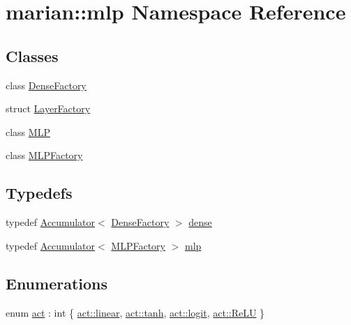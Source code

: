 \hypertarget{namespacemarian_1_1mlp}{}\section{marian\+:\+:mlp Namespace Reference}
\label{namespacemarian_1_1mlp}
\subsection*{Classes}
\begin{DoxyCompactItemize}
\item 
class \hyperlink{classmarian_1_1mlp_1_1DenseFactory}{Dense\+Factory}
\item 
struct \hyperlink{structmarian_1_1mlp_1_1LayerFactory}{Layer\+Factory}
\item 
class \hyperlink{classmarian_1_1mlp_1_1MLP}{M\+LP}
\item 
class \hyperlink{classmarian_1_1mlp_1_1MLPFactory}{M\+L\+P\+Factory}
\end{DoxyCompactItemize}
\subsection*{Typedefs}
\begin{DoxyCompactItemize}
\item 
typedef \hyperlink{classmarian_1_1Accumulator}{Accumulator}$<$ \hyperlink{classmarian_1_1mlp_1_1DenseFactory}{Dense\+Factory} $>$ \hyperlink{namespacemarian_1_1mlp_a8c25b1e343bf78e66cd9e33e607efeb5}{dense}
\item 
typedef \hyperlink{classmarian_1_1Accumulator}{Accumulator}$<$ \hyperlink{classmarian_1_1mlp_1_1MLPFactory}{M\+L\+P\+Factory} $>$ \hyperlink{namespacemarian_1_1mlp_a4d0fe240d31bdc33bcbdb5401de49e27}{mlp}
\end{DoxyCompactItemize}
\subsection*{Enumerations}
\begin{DoxyCompactItemize}
\item 
enum \hyperlink{namespacemarian_1_1mlp_ac16d27a877d16d7394f2057aee439d72}{act} \+: int \{ \hyperlink{namespacemarian_1_1mlp_ac16d27a877d16d7394f2057aee439d72a9a932b3cb396238423eb2f33ec17d6aa}{act\+::linear}, 
\hyperlink{namespacemarian_1_1mlp_ac16d27a877d16d7394f2057aee439d72a5c0dbba3a6ee4ac0eb26cfee75ccb8b4}{act\+::tanh}, 
\hyperlink{namespacemarian_1_1mlp_ac16d27a877d16d7394f2057aee439d72a79130f0e17bb058f015320f691eeb3dc}{act\+::logit}, 
\hyperlink{namespacemarian_1_1mlp_ac16d27a877d16d7394f2057aee439d72add10d919fa85cf27fc78c0e06fe0b378}{act\+::\+Re\+LU}
 \}
\end{DoxyCompactItemize}


